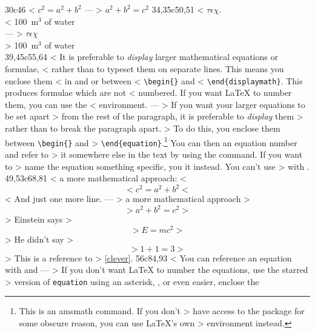 30c46
< $c^{2}=a^{2}+b^{2}$
---
> $a^2 + b^2 = c^2$
34,35c50,51
< $\tau\epsilon\chi$.\\[6pt]
< 100~m$^{3}$ of water\\[6pt]
---
> $\tau\epsilon\chi$\\[5pt]
> 100~m$^{3}$ of water\\[5pt]
39,45c55,64
< It is preferable to \emph{display} larger mathematical equations or formulae,
< rather than to typeset them on separate lines. This means you enclose them
< in \ci{[} and \ci{]} or between
< \verb|\begin{|\verb|}| and
<   \verb|\end{displaymath}|.  This produces formulae which are not
< numbered. If you want \LaTeX{} to number them, you can use the
<  environment.
---
> If you want your larger equations to be set apart
> from the rest of the paragraph, it is preferable to \emph{display} them
> rather than to break the paragraph apart.
> To do this, you enclose them between \verb|\begin{|\verb|}| and
> \verb|\end{equation}|.\footnote{This is an \textsf{amsmath} command. If you don't
> have access to the package for some obscure reason, you can use \LaTeX's own
>  environment instead.} You can then  an equation number and refer to
> it somewhere else in the text by using the  command. If you want to
> name the equation something specific, you  it instead. You can't use
>  with .
49,53c68,81
< a more mathematical approach:
< \begin{displaymath}
< c^{2}=a^{2}+b^{2}
< \end{displaymath}
< And just one more line.
---
> a more mathematical approach
>  \begin{equation}
>    a^2 + b^2 = c^2
>  \end{equation}
> Einstein says
>  \begin{equation}
>    E = mc^2 \label{clever}
>  \end{equation}
> He didn't say
>  \begin{equation}
>   1 + 1 = 3 \tag{dumb}
>  \end{equation}
> This is a reference to 
> \eqref{clever}. 
56c84,93
< You can reference an equation with  and 
---
> If you don't want \LaTeX{} to number the equations, use the starred
> version of \texttt{equation} using an asterisk, , or even easier, enclose the
